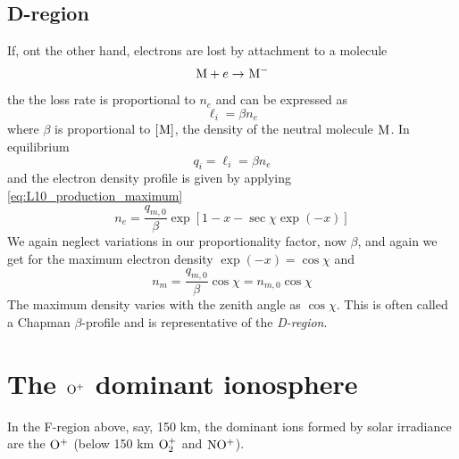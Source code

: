 \subsection{D-region}
If, ont the other hand, electrons are lost by attachment to a molecule
\begin{equation*}
    \prescript{}{}{\textnormal{M}}+e\rightarrow \prescript{}{}{\textnormal{M}}^-
\end{equation*}
the the loss rate is proportional to \(n_e\) and can be expressed as
\begin{equation*}
    \ell_i=\beta n_e
\end{equation*}
where \(\beta \) is proportional to \([\prescript{}{}{\textnormal{M}}]\), the density of the neutral molecule \(\prescript{}{}{\textnormal{M}}\). In equilibrium
\begin{equation*}
    q_i=\ell_i=\beta n_e
\end{equation*}
and the electron density profile is given by applying \cref{eq:L10_production_maximum}
\begin{equation*}
    n_e=\frac{q_{m,0}}{\beta}\exp\left[1-x-\sec\chi\exp(-x)\right]
\end{equation*}
We again neglect variations in our proportionality factor, now \(\beta \), and again we get for the maximum electron density \(\exp(-x)=\cos\chi \) and
\begin{equation*}
    n_m=\frac{q_{m,0}}{\beta}\cos\chi=n_{m,0}\cos\chi
\end{equation*}
The maximum density varies with the zenith angle as \(\cos\chi \). This is often called a Chapman \(\beta \)-profile and is representative of the \emph{D-region}.

\section{The \(\prescript{}{}{\textnormal{O}}^+\) dominant ionosphere}
In the F-region above, say, 150 km, the dominant ions formed by solar irradiance are the \(\prescript{}{}{\textnormal{O}}^+\) (below 150 km \(\prescript{}{}{\textnormal{O}}_2^+\) and \(\prescript{}{}{\textnormal{NO}}^+\)).

